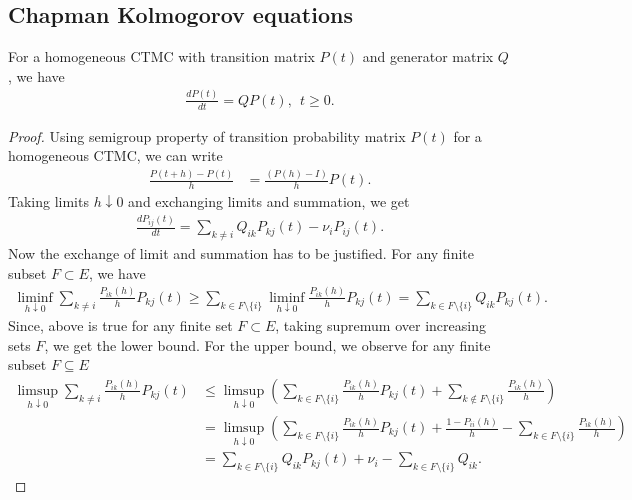 \documentclass[a4paper,10pt,english]{article}
\begin{document}
\subsection{Chapman Kolmogorov equations}
\begin{thm} For a homogeneous CTMC with transition matrix $P(t)$ and generator matrix $Q$, we have
\begin{align*}
\frac{dP(t)}{dt}=QP(t), ~~t \geqslant 0.
\end{align*}
\end{thm}
\begin{proof} 
Using semigroup property of transition probability matrix $P(t)$ for a homogeneous CTMC,  
we can write
\begin{align*}
\frac{P(t+h) - P(t)}{h} &= \frac{(P(h)- I)}{h}P(t). %
\end{align*}
Taking limits $h \downarrow 0$ and exchanging limits and summation, we get 
\begin{align*}
\frac{dP_{ij}(t)}{dt} = \sum_{k \neq i}Q_{ik}P_{kj}(t)-\nu_iP_{ij}(t). 
\end{align*}
Now the exchange of limit and summation has to be justified. For any finite subset $F \subset E$, we have
\begin{align*}
\liminf_{h \downarrow 0} \sum_{k \neq i}\frac{P_{ik}(h)}{h}P_{kj}(t) \geq \sum_{k \in F\setminus \{i\} }\liminf_{h \downarrow 0}\frac{P_{ik}(h)}{h}P_{kj}(t) = \sum_{k \in F\setminus \{i\}}Q_{ik}P_{kj}(t).
\end{align*}
Since, above is true for any finite set $F \subset E$, taking supremum over increasing sets $F$, we get the lower bound.
For the upper bound, we observe for any finite subset $F \subseteq E$
\begin{align*}
\limsup_{h \downarrow 0}\sum_{k \neq i}\frac{P_{ik}(h)}{h}P_{kj}(t) &\leq \limsup_{h \downarrow 0}\left(\sum_{k \in F\setminus \{i\}}\frac{P_{ik}(h)}{h}P_{kj}(t)+\sum_{k \notin F\setminus\{i\} }\frac{P_{ik}(h)}{h}\right)\\
& = \limsup_{h \downarrow 0}\left(\sum_{k \in F\setminus \{i\}}\frac{P_{ik}(h)}{h}P_{kj}(t)+\frac{1-P_{ii}(h)}{h} -\sum_{k \in F\setminus \{i\}}\frac{P_{ik}(h)}{h} \right)\\
&= \sum_{k \in F\setminus \{i\}}Q_{ik}P_{kj}(t)+\nu_i- \sum_{k \in F\setminus \{i\}}Q_{ik}. %
\end{align*}
\end{proof}
\end{document}
